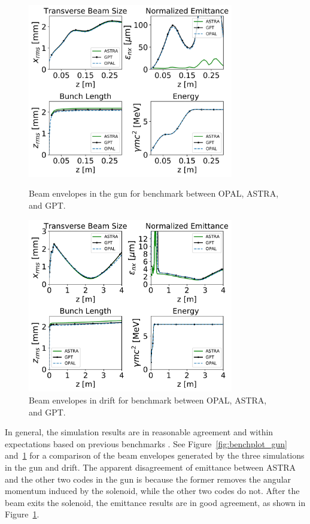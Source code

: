 \begin{figure}
	\begin{center}
		\includegraphics[width=0.8\textwidth]{images/benchmark_gun}
		\caption{Beam envelopes in the gun for benchmark between OPAL, ASTRA, and GPT.}
	    \label{fig:benchplot_gun}

        \vspace*{\floatsep}
        
		\includegraphics[width=0.8\textwidth]{images/benchmark_5m}
		\caption{Beam envelopes in drift for benchmark between OPAL, ASTRA, and GPT.}
	    \label{fig:benchplot_5m}
	\end{center}
\end{figure}

In general, the simulation results are in reasonable agreement 
and within expectations based on previous benchmarks \cite{codecompare}. 
See Figure~\ref{fig:benchplot_gun} and~\ref{fig:benchplot_5m} 
for a comparison of the beam envelopes generated by the three simulations in the gun and drift. 
The apparent disagreement of emittance between ASTRA and the other
two codes in the gun is because the former removes the angular momentum   
induced by the solenoid, while the other two codes do not. 
After the beam exits the solenoid, the emittance results  
are in good agreement, as shown in Figure~\ref{fig:benchplot_5m}.

